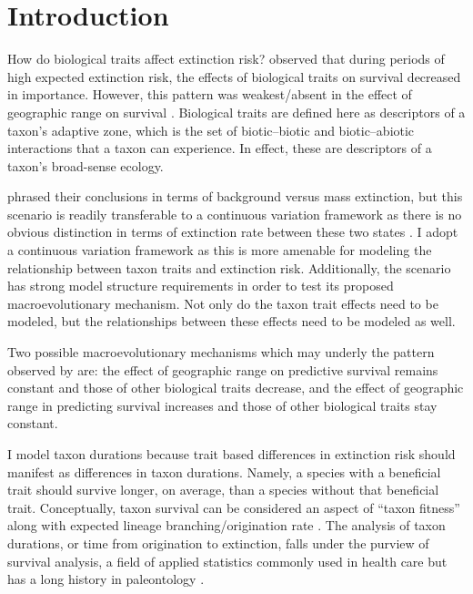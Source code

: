 \documentclass[12pt,letterpaper]{article}
\begin{document}
\section{Introduction}

How do biological traits affect extinction risk? \citet{Jablonski1986} observed that during periods of high expected extinction risk, the effects of biological traits on survival decreased in importance. However, this pattern was weakest/absent in the effect of geographic range on survival \citep{Jablonski1986}. Biological traits are defined here as descriptors of a taxon's adaptive zone, which is the set of biotic--biotic and biotic--abiotic interactions that a taxon can experience. In effect, these are descriptors of a taxon's broad-sense ecology.

\citet{Jablonski1986} phrased their conclusions in terms of background versus mass extinction, but this scenario is readily transferable to a continuous variation framework as there is no obvious distinction in terms of extinction rate between these two states \citep{Wang2003}. I adopt a continuous variation framework as this is more amenable for modeling the relationship between taxon traits and extinction risk. Additionally, the \citet{Jablonski1986} scenario has strong model structure requirements in order to test its proposed macroevolutionary mechanism. Not only do the taxon trait effects need to be modeled, but the relationships between these effects need to be modeled as well. 

Two possible macroevolutionary mechanisms which may underly the pattern observed by \citet{Jablonski1986} are: the effect of geographic range on predictive survival remains constant and those of other biological traits decrease, and the effect of geographic range in predicting survival increases and those of other biological traits stay constant. 

I model taxon durations because trait based differences in extinction risk should manifest as differences in taxon durations. Namely, a species with a beneficial trait should survive longer, on average, than a species without that beneficial trait. Conceptually, taxon survival can be considered an aspect of ``taxon fitness'' along with expected lineage branching/origination rate \citep{Cooper1984,Palmer2012}. The analysis of taxon durations, or time from origination to extinction, falls under the purview of survival analysis, a field of applied statistics commonly used in health care \citep{Klein2003} but has a long history in paleontology \citep{Simpson1944,Simpson1953,VanValen1973,VanValen1979}.
\end{document}
